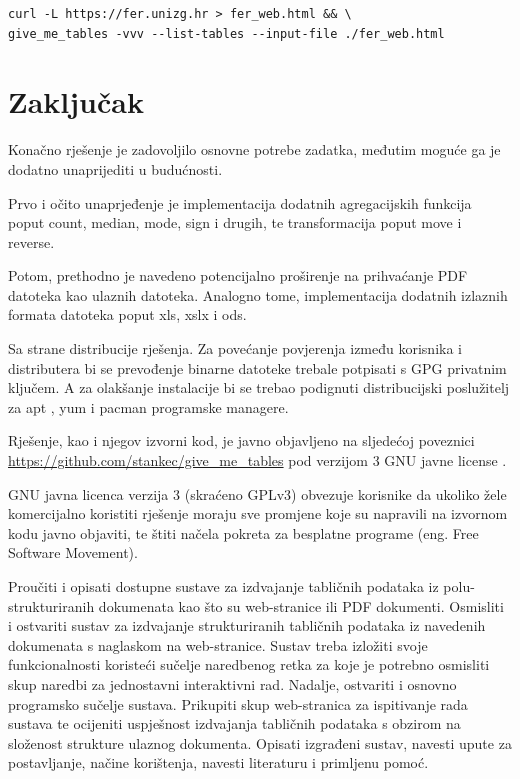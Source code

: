 \documentclass[times, utf8, zavrsni]{fer}
\begin{document}
\begin{lstlisting}
curl -L https://fer.unizg.hr > fer_web.html && \
give_me_tables -vvv --list-tables --input-file ./fer_web.html
\end{lstlisting}



\chapter{Zaključak}

Konačno rješenje je zadovoljilo osnovne potrebe zadatka, međutim moguće ga je
dodatno unaprijediti u budućnosti.

Prvo i očito unaprjeđenje je implementacija dodatnih agregacijskih funkcija
poput count, median, mode, sign i drugih, te transformacija poput move i
reverse.

Potom, prethodno je navedeno potencijalno proširenje na prihvaćanje PDF
datoteka kao ulaznih datoteka. Analogno tome, implementacija dodatnih
izlaznih formata datoteka poput xls, xslx i ods.

Sa strane distribucije rješenja. Za povećanje povjerenja između korisnika i
distributera bi se prevođenje binarne datoteke trebale potpisati s GPG
privatnim ključem. A za olakšanje instalacije bi se trebao podignuti
distribucijski poslužitelj za apt \cite{apt_wiki}, yum \cite{yum_wiki} i
pacman \cite{pacman_wiki} programske managere.

Rješenje, kao i njegov izvorni kod, je javno objavljeno na sljedećoj
poveznici \url{https://github.com/stankec/give_me_tables} pod verzijom 3 GNU
javne license \cite{gplv3_license}.

GNU javna licenca verzija 3 (skraćeno GPLv3) obvezuje korisnike da ukoliko
žele komercijalno koristiti rješenje moraju sve promjene koje su napravili na
izvornom kodu javno objaviti, te štiti načela pokreta za besplatne programe
\cite{free_software_movement_manifesto} (eng. Free Software Movement).





\begin{sazetak}

Proučiti i opisati dostupne sustave za izdvajanje tabličnih podataka iz
polu-strukturiranih dokumenata kao što su web-stranice ili PDF dokumenti.
Osmisliti i ostvariti sustav za izdvajanje strukturiranih tabličnih podataka iz
navedenih dokumenata s naglaskom na web-stranice.
Sustav treba izložiti svoje funkcionalnosti koristeći sučelje naredbenog retka
za koje je potrebno osmisliti skup naredbi za jednostavni interaktivni rad.
Nadalje, ostvariti i osnovno programsko sučelje sustava. Prikupiti skup
web-stranica za ispitivanje rada sustava te ocijeniti uspješnost izdvajanja
tabličnih podataka s obzirom na složenost strukture ulaznog dokumenta. Opisati
izgrađeni sustav, navesti upute za postavljanje, načine korištenja, navesti
literaturu i primljenu pomoć.

\kljucnerijeci{}
\end{sazetak}
\end{document}
